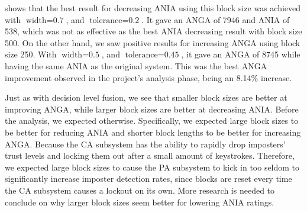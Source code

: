  shows that the best result for decreasing ANIA using this block size was achieved with $\text{width} = \text{0.7}$, and $\text{tolerance} = \text{0.2}$.
It gave an ANGA of 7946 and ANIA of 538, which was not as effective as the best ANIA decreasing result with block size 500.
On the other hand, we saw positive results for increasing ANGA using block size 250.
With $\text{width} = \text{0.5}$, and $\text{tolerance} = \text{0.45}$, it gave an ANGA of 8745 while having the same ANIA as the original system.
This was the best ANGA improvement observed in the project's analysis phase, being an 8.14\% increase.

Just as with decision level fusion, we see that smaller block sizes are better at improving ANGA, while larger block sizes are better at decreasing ANIA.
Before the analysis, we expected otherwise.
Specifically, we expected large block sizes to be better for reducing ANIA and shorter block lengths to be better for increasing ANGA.
Because the CA subsystem has the ability to rapidly drop imposters' trust levels and locking them out after a small amount of keystrokes. 
Therefore, we expected large block sizes to cause the PA subsystem to kick in too seldom to significantly increase imposter detection rates, since blocks are reset every time the CA subsystem causes a lockout on its own.
More research is needed to conclude on why larger block sizes seem better for lowering ANIA ratings.








